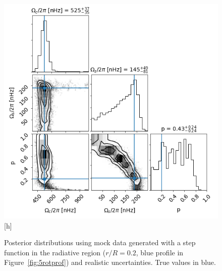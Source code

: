 \begin{figure}
\centering
    \includegraphics[width=\textwidth]{Figures/subgiant_chapter_figures/10.2_corner.png}[h]
    \caption{Posterior distributions using mock data generated with a step function in the radiative region ($r/R = 0.2$, blue profile in Figure~\ref{fig:5rotprof}) and realistic uncertainties. True values in blue.}
    \label{fig:mock_posterior_020_uniform}
\end{figure}
